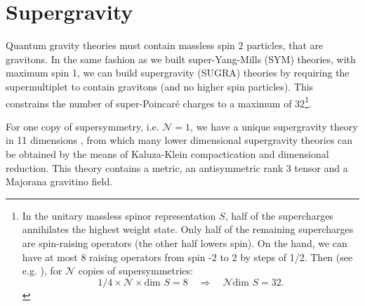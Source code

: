 \chapter{Supergravity }\label{ch:supergravity}


Quantum gravity theories must contain massless spin 2 particles, that are gravitons.
In the same fashion as we built super-Yang-Mills (SYM) theories, with maximum spin 1,
we can build supergravity (SUGRA) theories by requiring the supermultiplet to contain gravitons (and no higher spin particles).
This constrains the number of super-Poincar\'e charges to a maximum of 32\footnote{
In the unitary massless spinor representation $S$, half of the supercharges annihilates the highest weight state.
Only half of the remaining supercharges are spin-raising operators (the other half lowers spin).
On the hand, we can have at most 8 raising operators from spin -2 to 2 by steps of 1/2. 
Then (see e.g. \cite{DHoker:2002nbb}), for $\mathcal{N}$ copies of supersymmetries:
\[
1/4 \times \mathcal{N} \times \text{dim } S = 8 
\quad \Rightarrow \quad
\mathcal{N}  \text{dim } S = 32.
\]
}.


For one copy of supersymmetry, i.e. $\mathcal{N} = 1$, 
we have a unique supergravity theory in 11 dimensions \cite{Cremmer:1978km}, 
from which many lower dimensional supergravity theories can be obtained by the means of 
Kaluza-Klein compactication and dimensional reduction.
This theory contains a metric, an antisymmetric rank 3 tensor and a Majorana gravitino field.


